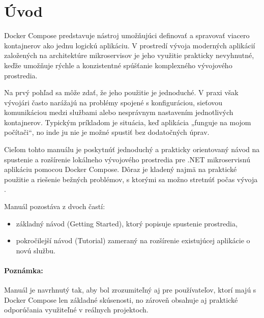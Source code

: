﻿\section*{Úvod}

Docker Compose predstavuje nástroj umožňujúci definovať a spravovať viacero kontajnerov ako jednu logickú aplikáciu. 
V prostredí vývoja moderných aplikácií založených na architektúre mikroservisov je jeho využitie prakticky nevyhnutné, 
keďže umožňuje rýchle a konzistentné spúšťanie komplexného vývojového prostredia.

Na prvý pohľad sa môže zdať, že jeho použitie je jednoduché. 
V praxi však vývojári často narážajú na problémy spojené s konfiguráciou, sieťovou komunikáciou medzi službami 
alebo nesprávnym nastavením jednotlivých kontajnerov. Typickým príkladom je situácia, keď aplikácia „funguje na mojom počítači“, 
no inde ju nie je možné spustiť bez dodatočných úprav.

Cieľom tohto manuálu je poskytnúť jednoduchý a prakticky orientovaný návod na spustenie a rozšírenie lokálneho vývojového prostredia 
pre .NET mikroservisnú aplikáciu pomocou Docker Compose. Dôraz je kladený najmä na praktické použitie a riešenie bežných problémov, 
s ktorými sa možno stretnúť počas vývoja \cite{dockercompose}.

\medskip

Manuál pozostáva z dvoch častí:
\begin{itemize}
    \item základný návod (Getting Started), ktorý popisuje spustenie prostredia,
    \item pokročilejší návod (Tutorial) zameraný na rozšírenie existujúcej aplikácie o novú službu.
\end{itemize}

\paragraph{Poznámka:}
Manuál je navrhnutý tak, aby bol zrozumiteľný aj pre používateľov, ktorí majú s Docker Compose len základné skúsenosti, 
no zároveň obsahuje aj praktické odporúčania využiteľné v reálnych projektoch.

\clearpage
